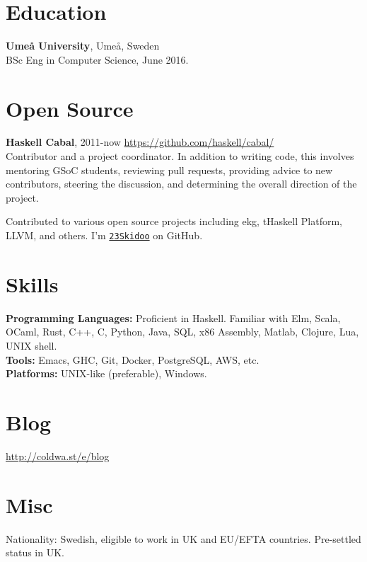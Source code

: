 \documentclass[margin,line]{res}
\begin{document}
\begin{resume}
\section{\sc Education}
{\bf Umeå University}, Umeå, Sweden\\
BSc Eng in Computer Science, June 2016.

\section{\sc Open Source}

{\bf Haskell Cabal}, 2011-now \hfill \url{https://github.com/haskell/cabal/}\\
Contributor and a project coordinator. In addition to writing code,
this involves mentoring GSoC students, reviewing pull requests,
providing advice to new contributors, steering the discussion, and
determining the overall direction of the project.

Contributed to various open source projects including
ekg, tHaskell Platform, LLVM, and others. I'm
\href{https://github.com/23Skidoo/}{\texttt{23Skidoo}} on GitHub.

\section{\sc Skills}

{\bf Programming Languages:} Proficient in Haskell. Familiar
with Elm, Scala, OCaml, Rust, C++, C, Python, Java, SQL, x86 Assembly, Matlab, Clojure, Lua, UNIX shell. \\
{\bf Tools:} Emacs, GHC, Git, Docker, PostgreSQL, AWS, etc.\\
{\bf Platforms:} UNIX-like (preferable), Windows.

\section{\sc Blog}
\url{http://coldwa.st/e/blog}

\section{\sc Misc}

Nationality: Swedish, eligible to work in UK and EU/EFTA countries. Pre-settled status in UK.

\end{resume}
\end{document}
